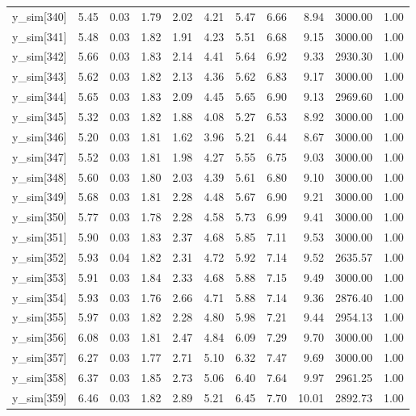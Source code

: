\begin{table}[ht]
\begin{tabular}{rrrrrrrrrrr}
  y\_sim[340] & 5.45 & 0.03 & 1.79 & 2.02 & 4.21 & 5.47 & 6.66 & 8.94 & 3000.00 & 1.00 \\ 
  y\_sim[341] & 5.48 & 0.03 & 1.82 & 1.91 & 4.23 & 5.51 & 6.68 & 9.15 & 3000.00 & 1.00 \\ 
  y\_sim[342] & 5.66 & 0.03 & 1.83 & 2.14 & 4.41 & 5.64 & 6.92 & 9.33 & 2930.30 & 1.00 \\ 
  y\_sim[343] & 5.62 & 0.03 & 1.82 & 2.13 & 4.36 & 5.62 & 6.83 & 9.17 & 3000.00 & 1.00 \\ 
  y\_sim[344] & 5.65 & 0.03 & 1.83 & 2.09 & 4.45 & 5.65 & 6.90 & 9.13 & 2969.60 & 1.00 \\ 
  y\_sim[345] & 5.32 & 0.03 & 1.82 & 1.88 & 4.08 & 5.27 & 6.53 & 8.92 & 3000.00 & 1.00 \\ 
  y\_sim[346] & 5.20 & 0.03 & 1.81 & 1.62 & 3.96 & 5.21 & 6.44 & 8.67 & 3000.00 & 1.00 \\ 
  y\_sim[347] & 5.52 & 0.03 & 1.81 & 1.98 & 4.27 & 5.55 & 6.75 & 9.03 & 3000.00 & 1.00 \\ 
  y\_sim[348] & 5.60 & 0.03 & 1.80 & 2.03 & 4.39 & 5.61 & 6.80 & 9.10 & 3000.00 & 1.00 \\ 
  y\_sim[349] & 5.68 & 0.03 & 1.81 & 2.28 & 4.48 & 5.67 & 6.90 & 9.21 & 3000.00 & 1.00 \\ 
  y\_sim[350] & 5.77 & 0.03 & 1.78 & 2.28 & 4.58 & 5.73 & 6.99 & 9.41 & 3000.00 & 1.00 \\ 
  y\_sim[351] & 5.90 & 0.03 & 1.83 & 2.37 & 4.68 & 5.85 & 7.11 & 9.53 & 3000.00 & 1.00 \\ 
  y\_sim[352] & 5.93 & 0.04 & 1.82 & 2.31 & 4.72 & 5.92 & 7.14 & 9.52 & 2635.57 & 1.00 \\ 
  y\_sim[353] & 5.91 & 0.03 & 1.84 & 2.33 & 4.68 & 5.88 & 7.15 & 9.49 & 3000.00 & 1.00 \\ 
  y\_sim[354] & 5.93 & 0.03 & 1.76 & 2.66 & 4.71 & 5.88 & 7.14 & 9.36 & 2876.40 & 1.00 \\ 
  y\_sim[355] & 5.97 & 0.03 & 1.82 & 2.28 & 4.80 & 5.98 & 7.21 & 9.44 & 2954.13 & 1.00 \\ 
  y\_sim[356] & 6.08 & 0.03 & 1.81 & 2.47 & 4.84 & 6.09 & 7.29 & 9.70 & 3000.00 & 1.00 \\ 
  y\_sim[357] & 6.27 & 0.03 & 1.77 & 2.71 & 5.10 & 6.32 & 7.47 & 9.69 & 3000.00 & 1.00 \\ 
  y\_sim[358] & 6.37 & 0.03 & 1.85 & 2.73 & 5.06 & 6.40 & 7.64 & 9.97 & 2961.25 & 1.00 \\ 
  y\_sim[359] & 6.46 & 0.03 & 1.82 & 2.89 & 5.21 & 6.45 & 7.70 & 10.01 & 2892.73 & 1.00 \\ 

\end{tabular}
\end{table}
